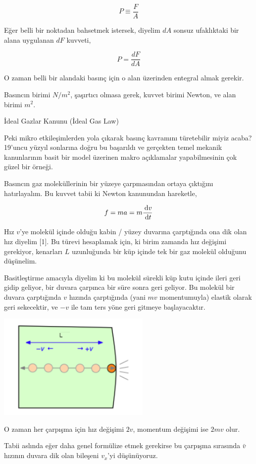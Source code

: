 \documentclass[12pt,fleqn]{article}\usepackage{../../common}
\begin{document}
$$
P \equiv \frac{F}{A}
$$

Eğer belli bir noktadan bahsetmek istersek, diyelim $dA$ sonsuz
ufaklıktaki bir alana uygulanan $dF$ kuvveti,

$$
P = \frac{dF}{dA}
$$

O zaman belli bir alandaki basınç için o alan üzerinden entegral almak gerekir. 

Basıncın birimi $N / m^2$, şaşırtıcı olmasa gerek, kuvvet birimi
Newton, ve alan birimi $m^2$.

İdeal Gazlar Kanunu (İdeal Gas Law)

Peki mikro etkileşimlerden yola çıkarak basınç kavramını türetebilir miyiz
acaba? 19'uncu yüzyıl sonlarına doğru bu başarıldı ve gerçekten temel mekanik
kanunlarının basit bir model üzerinen makro açıklamalar yapabilmesinin çok güzel
bir örneği.

Basıncın gaz moleküllerinin bir yüzeye çarpmasından ortaya çıktığını
hatırlayalım. Bu kuvvet tabii ki Newton kanunundan hareketle,

$$
f = m a = m \frac{\,\mathrm{d} v}{\,\mathrm{d} t}
$$

Hız $v$'ye molekül içinde olduğu kabin / yüzey duvarına çarptığında ona dik olan
hız diyelim [1]. Bu türevi hesaplamak için, ki birim zamanda hız değişimi
gerekiyor, kenarları $L$ uzunluğunda bir küp içinde tek bir gaz molekül olduğunu
düşünelim.

Basitleştirme amacıyla diyelim ki bu molekül sürekli küp kutu içinde ileri geri
gidip geliyor, bir duvara çarpınca bir süre sonra geri geliyor. Bu molekül bir
duvara çarptığında $v$ hızında çarptığında (yani $mv$ momentumuyla) elastik
olarak geri sekecektir, ve $-v$ ile tam ters yöne geri gitmeye başlayacaktır.

\includegraphics[width=20em]{phy_005_basics_04.png}

O zaman her çarpışma için hız değişimi $2v$, momentum değişimi ise $2mv$
olur.

Tabii aslında eğer daha genel formülize etmek gerekirse bu çarpışma sırasında
$\bar{v}$ hızının duvara dik olan bileşeni $v_x$'yi düşünüyoruz.
\end{document}
